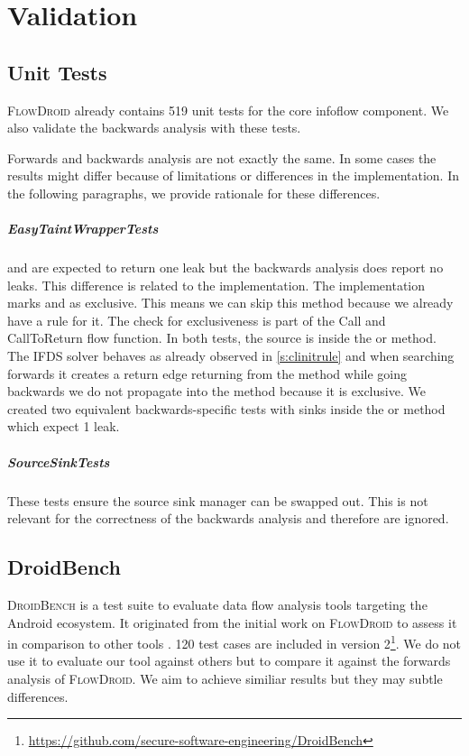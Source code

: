 \documentclass[../draft.tex]{subfiles}
\begin{document}
    \chapter{Validation}
    \section{Unit Tests}
    \textsc{FlowDroid} already contains 519 unit tests for the core infoflow component. We also validate the backwards analysis with these tests.

    Forwards and backwards analysis are not exactly the same. In some cases the results might differ because of limitations or differences in the implementation. In the following paragraphs, we provide rationale for these differences.

    \paragraph{EasyTaintWrapperTests}  and  are expected to return one leak but the backwards analysis does report no leaks. This difference is related to the  implementation. The implementation marks  and  as exclusive. This means we can skip this method because we already have a rule for it. The check for exclusiveness is part of the Call and CallToReturn flow function. In both tests, the source is inside the  or  method. The IFDS solver behaves as already observed in \autoref{s:clinitrule} and when searching forwards it creates a return edge returning from the method while going backwards we do not propagate into the method because it is exclusive.
    We created two equivalent backwards-specific tests with sinks inside the  or  method which expect 1 leak.
    
    \paragraph{SourceSinkTests} These tests ensure the source sink manager can be swapped out. This is not relevant for the correctness of the backwards analysis and therefore are ignored.

    

    \section{DroidBench}
    \textsc{DroidBench} is a test suite to evaluate data flow analysis tools targeting the Android ecosystem. It originated from the initial work on \textsc{FlowDroid} to assess it in comparison to other tools \cite{Arzt2014}. 120 test cases are included in version 2\footnote{\url{https://github.com/secure-software-engineering/DroidBench}}.
    We do not use it to evaluate our tool against others but to compare it against the forwards analysis of \textsc{FlowDroid}. We aim to achieve similiar results but they may subtle differences.
    
\end{document}
